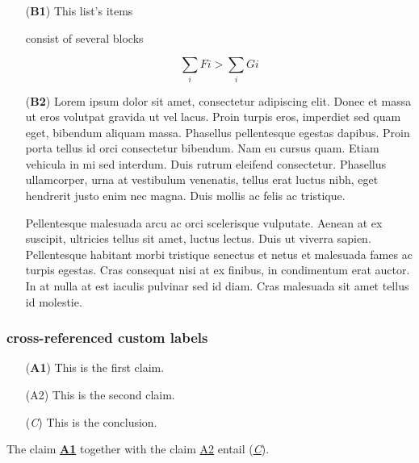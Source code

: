 \begin{itemize}
\tightlist

\item[(\textbf{B1})] This list's items

consist of several blocks

\[\sum_i Fi > \sum_i Gi\]

\item[(\textbf{B2})] Lorem ipsum dolor sit amet, consectetur adipiscing
elit. Donec et massa ut eros volutpat gravida ut vel lacus. Proin turpis
eros, imperdiet sed quam eget, bibendum aliquam massa. Phasellus
pellentesque egestas dapibus. Proin porta tellus id orci consectetur
bibendum. Nam eu cursus quam. Etiam vehicula in mi sed interdum. Duis
rutrum eleifend consectetur. Phasellus ullamcorper, urna at vestibulum
venenatis, tellus erat luctus nibh, eget hendrerit justo enim nec magna.
Duis mollis ac felis ac tristique.

Pellentesque malesuada arcu ac orci scelerisque vulputate. Aenean at ex
suscipit, ultricies tellus sit amet, luctus lectus. Duis ut viverra
sapien. Pellentesque habitant morbi tristique senectus et netus et
malesuada fames ac turpis egestas. Cras consequat nisi at ex finibus, in
condimentum erat auctor. In at nulla at est iaculis pulvinar sed id
diam. Cras malesuada sit amet tellus id molestie.

\end{itemize}

\hypertarget{cross-referenced-custom-labels}{%
\subsubsection{cross-referenced custom
labels}\label{cross-referenced-custom-labels}}

\begin{itemize}
\tightlist

\item[(\textbf{A1})] This is the first claim.

\item[(A2)] This is the second claim.

\item[(\emph{C})] This is the conclusion.

\end{itemize}

The claim \protect\hyperlink{A1ref}{\textbf{A1}} together with the claim
\protect\hyperlink{A2ref}{A2} entail
(\protect\hyperlink{Cref}{\emph{C}}).

